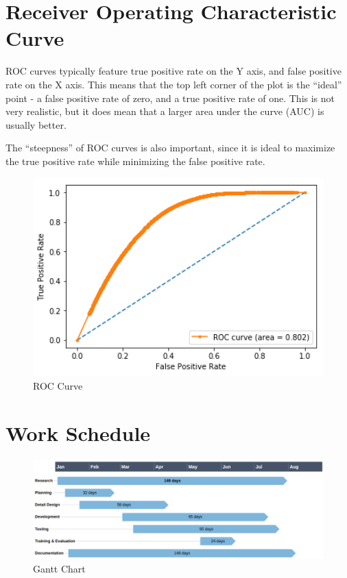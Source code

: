 \clearpage
\section{Receiver Operating Characteristic Curve}
\ac{ROC} curves typically feature true positive rate on the Y axis, and false positive rate on the X axis. This means that the top left corner of the plot is the “ideal” point - a false positive rate of zero, and a true positive rate of one. This is not very realistic, but it does mean that a larger area under the curve (AUC) is usually better.

The “steepness” of \ac{ROC} curves is also important, since it is ideal to maximize the true positive rate while minimizing the false positive rate.


\begin{figure}[tbh]
\begin{center}
	\includegraphics[width = 4.5in]{images/roc.png}
	\caption{\ac{ROC} Curve} %
\end{center}
\end{figure}


\section{Work Schedule}
\begin{figure}[H]
\begin{center}
	\includegraphics[width = 6in]{images/gantt_.png}
	\caption{Gantt Chart} %
	\label{Gantt Chart} %
\end{center}
\end{figure}

